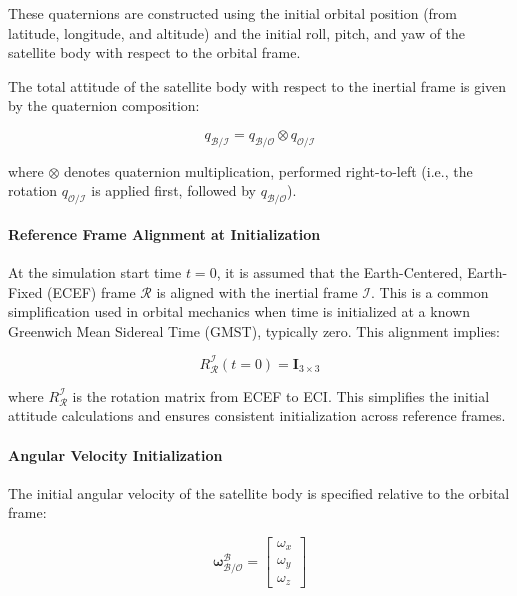These quaternions are constructed using the initial orbital position (from latitude, longitude, and altitude) and the initial roll, pitch, and yaw of the satellite body with respect to the orbital frame. 

The total attitude of the satellite body with respect to the inertial frame is given by the quaternion composition:

\begin{equation}
    q_{\mathcal{B}/\mathcal{I}} = q_{\mathcal{B}/\mathcal{O}} \otimes q_{\mathcal{O}/\mathcal{I}}
\end{equation}

where \( \otimes \) denotes quaternion multiplication, performed right-to-left (i.e., the rotation \( q_{\mathcal{O}/\mathcal{I}} \) is applied first, followed by \( q_{\mathcal{B}/\mathcal{O}} \)).

\paragraph{Reference Frame Alignment at Initialization}

At the simulation start time \( t = 0 \), it is assumed that the Earth-Centered, Earth-Fixed (ECEF) frame \( \mathcal{R} \) is aligned with the inertial frame \( \mathcal{I} \). This is a common simplification used in orbital mechanics when time is initialized at a known Greenwich Mean Sidereal Time (GMST), typically zero. This alignment implies:

\begin{equation}
    R_\mathcal{R}^\mathcal{I}(t=0) = \mathbf{I}_{3 \times 3}
\end{equation}

where \( R_\mathcal{R}^\mathcal{I} \) is the rotation matrix from ECEF to ECI. This simplifies the initial attitude calculations and ensures consistent initialization across reference frames.

\paragraph{Angular Velocity Initialization}

The initial angular velocity of the satellite body is specified relative to the orbital frame:

\begin{equation}
    \boldsymbol{\omega}_{\mathcal{B/O}}^{\mathcal{B}} = 
    \begin{bmatrix}
        \omega_x \\
        \omega_y \\
        \omega_z
    \end{bmatrix}
\end{equation}

